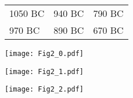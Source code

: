 \documentclass[12pt]{article}
\begin{document}
 

\begin{figure}
%

\begin{minipage}{8cm} 
\centering
\renewcommand{\arraystretch}{0.7}
    \begin{tabular}{lll}
 {\color{red} \raisebox{1pt}{ \scalebox{0.5}{$ \bigstar$} } {\tiny 1050 BC } } & {\color{green(ryb)} \raisebox{1pt}{ \scalebox{0.5}{$ \bigstar$} } {\tiny 940 BC } } &  {\color{magenta} \raisebox{1pt}{ \scalebox{0.5}{$ \bigstar$} } {\tiny 790 BC } } \\
{\color{orange(ryb)} \raisebox{1pt}{ \scalebox{0.5}{$ \bigstar$} } {\tiny 970 BC } } & {\color{blue} \raisebox{1pt}{ \scalebox{0.5}{$ \bigstar$} } {\tiny 890 BC } } & {\color{black} \raisebox{1pt}{ \scalebox{0.5}{$ \bigstar$} } {\tiny 670 BC } }\\
    \end{tabular}
\end{minipage}
\vfill
%
\begin{minipage}{8cm} 
\texttt{[image: Fig2\_0.pdf]}
\end{minipage}
\vfill
\vspace{0.3cm}
\begin{minipage}{8cm} 
\texttt{[image: Fig2\_1.pdf]}
\end{minipage}
\vfill
\vspace{0.3cm}
\begin{minipage}{8cm} 
\texttt{[image: Fig2\_2.pdf]}
\end{minipage}
\end{figure}
\end{document}
